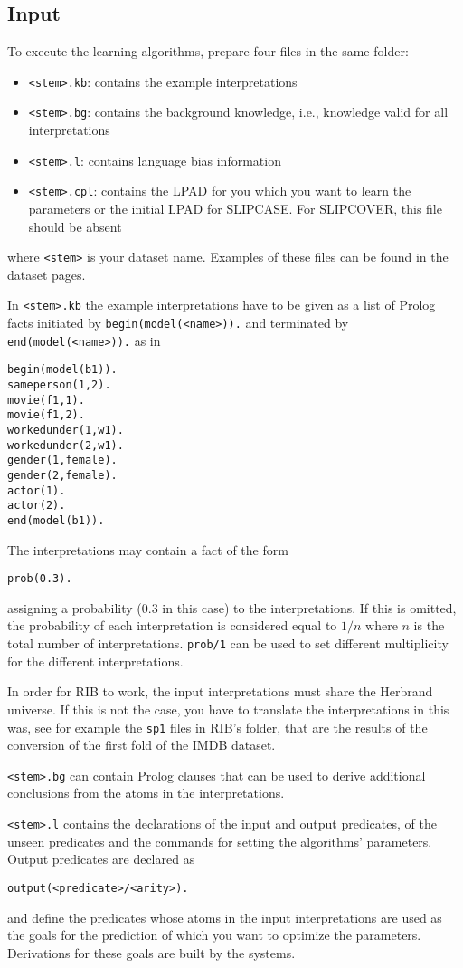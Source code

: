 \documentclass[a4paper,10pt]{article}
\begin{document}
\subsection{Input}
To execute the learning algorithms, prepare four files in the same folder: 
\begin{itemize}
\item \texttt{<stem>.kb}: contains the example interpretations 
\item \texttt{<stem>.bg}: contains the background knowledge, i.e., knowledge valid for all interpretations
\item \texttt{<stem>.l}: contains language bias information
\item \texttt{<stem>.cpl}: contains the LPAD for you which you want to learn the parameters or the initial LPAD for SLIPCASE. For SLIPCOVER, this file should be absent
\end{itemize}
where \texttt{<stem>} is your dataset name. Examples of these files can be found in the dataset pages.

In \texttt{<stem>.kb} the example interpretations have to be given as a list of Prolog facts initiated by 
\texttt{begin(model(<name>)).} and terminated by \texttt{end(model(<name>)).} as in
\begin{verbatim}
begin(model(b1)).
sameperson(1,2).
movie(f1,1).
movie(f1,2).
workedunder(1,w1).
workedunder(2,w1).
gender(1,female).
gender(2,female).
actor(1).
actor(2).
end(model(b1)).
\end{verbatim}
The interpretations may contain a fact of the form
\begin{verbatim}
prob(0.3).
\end{verbatim}
assigning a probability (0.3 in this case) to the interpretations. If this is omitted, the probability of each interpretation is considered equal to $1/n$ where $n$ is the total number of interpretations. \verb|prob/1| can be used to set different multiplicity for the different interpretations.

In order for RIB to work, the input interpretations must share the Herbrand universe. If this is not the case, you have to translate the interpretations in this was, see for example the \texttt{sp1} files in RIB's folder, that are the results of the conversion of the first fold of the IMDB dataset.

\texttt{<stem>.bg} can contain Prolog clauses that can be used to derive additional conclusions from the atoms in 
the interpretations.

\texttt{<stem>.l} contains the declarations of the input and output predicates, of the unseen predicates and the commands for setting the algorithms' parameters.
Output predicates are declared as
\begin{verbatim}
output(<predicate>/<arity>).
\end{verbatim}
and define the predicates whose atoms in the input interpretations are used as the goals for the prediction of which you want to optimize the parameters. Derivations for these goals are built by the systems.
\end{document}
